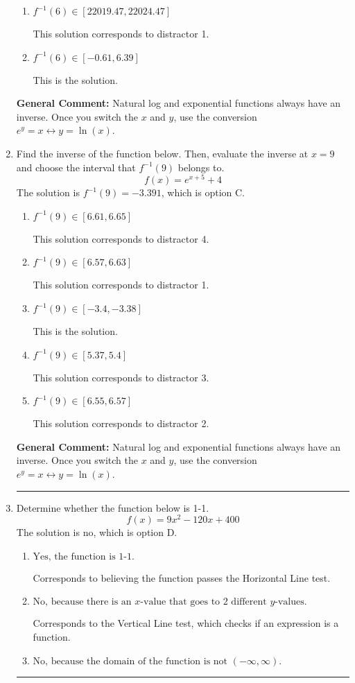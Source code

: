 \documentclass{extbook}[14pt]
\newcommand{\litem}[1]{\item #1

\rule{\textwidth}{0.4pt}}
\begin{document}
\begin{enumerate}
{\begin{enumerate}[label=\Alph*.]
 This solution corresponds to distractor 3.
\item \( f^{-1}(6) \in [22019.47, 22024.47] \)

 This solution corresponds to distractor 1.
\item \( f^{-1}(6) \in [-0.61, 6.39] \)

 This is the solution.
\end{enumerate}

\textbf{General Comment:} Natural log and exponential functions always have an inverse. Once you switch the $x$ and $y$, use the conversion $ e^y = x \leftrightarrow y=\ln(x)$.
}
\litem{
Find the inverse of the function below. Then, evaluate the inverse at $x = 9$ and choose the interval that $f^{-1}(9)$ belongs to.
\[ f(x) = e^{x+5}+4 \]The solution is \( f^{-1}(9) = -3.391 \), which is option C.\begin{enumerate}[label=\Alph*.]
\item \( f^{-1}(9) \in [6.61, 6.65] \)

 This solution corresponds to distractor 4.
\item \( f^{-1}(9) \in [6.57, 6.63] \)

 This solution corresponds to distractor 1.
\item \( f^{-1}(9) \in [-3.4, -3.38] \)

 This is the solution.
\item \( f^{-1}(9) \in [5.37, 5.4] \)

 This solution corresponds to distractor 3.
\item \( f^{-1}(9) \in [6.55, 6.57] \)

 This solution corresponds to distractor 2.
\end{enumerate}

\textbf{General Comment:} Natural log and exponential functions always have an inverse. Once you switch the $x$ and $y$, use the conversion $ e^y = x \leftrightarrow y=\ln(x)$.
}
\litem{
Determine whether the function below is 1-1.
\[ f(x) = 9 x^2 - 120 x + 400 \]The solution is \( \text{no} \), which is option D.\begin{enumerate}[label=\Alph*.]
\item \( \text{Yes, the function is 1-1.} \)

Corresponds to believing the function passes the Horizontal Line test.
\item \( \text{No, because there is an $x$-value that goes to 2 different $y$-values.} \)

Corresponds to the Vertical Line test, which checks if an expression is a function.
\item \( \text{No, because the domain of the function is not $(-\infty, \infty)$.} \)


\end{enumerate}}
\end{enumerate}
\end{document}
